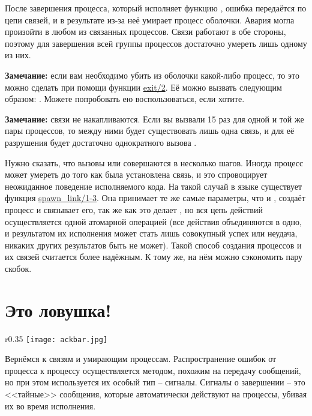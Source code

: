 После завершения процесса, который исполняет функцию , ошибка передаётся по цепи связей, и в результате из\--за неё умирает процесс оболочки.
Авария могла произойти в любом из связанных процессов.
Связи работают в обе стороны, поэтому для завершения всей группы процессов достаточно умереть лишь одному из них.\\
\colorbox{lgray}
{
\begin{minipage}{1.0\linewidth}
    \textbf{Замечание:} если вам необходимо убить из оболочки какой\--либо процесс, то это можно сделать при помощи функции \href{http://erldocs.com/R15B/erts/erlang.html\#exit/2}{exit/2}.
    Её можно вызвать следующим образом: .
    Можете попробовать ею воспользоваться, если хотите.
\end{minipage}
}
\colorbox{lgray}
{
\begin{minipage}{1.0\linewidth}
    \textbf{Замечание:} связи не накапливаются.
    Если вы вызвали  15 раз для одной и той же пары процессов, то между ними будет существовать лишь одна связь, и для её разрушения будет достаточно однократного вызова .
\end{minipage}
}

Нужно сказать, что вызовы  или  совершаются в несколько шагов.
Иногда процесс может умереть до того как была установлена связь, и это спровоцирует неожиданное поведение исполняемого кода.
На такой случай в языке существует функция \href{http://erldocs.com/R15B/erts/erlang.html\#spawn_link/1}{spawn\_link/1-3}.
Она принимает те же самые параметры, что и , создаёт процесс и связывает его, так же как это делает , но вся цепь действий осуществляется одной атомарной операцией (все действия объединяются в одно, и результатом их исполнения может стать лишь совокупный успех или неудача, никаких других результатов быть не может).
Такой способ создания процессов и их связей считается более надёжным.
К тому же, на нём можно сэкономить пару скобок.
\section{Это ловушка!}
\label{its-a-trap}
\begin{wrapfigure}{r}{0.35\linewidth}
    \texttt{[image: ackbar.jpg]}
\end{wrapfigure}
Вернёмся к связям и умирающим процессам.
Распространение ошибок от процесса к процессу осуществляется методом, похожим на передачу сообщений, но при этом используется их особый тип \--- сигналы.
Сигналы о завершении \--- это <<тайные>> сообщения, которые автоматически действуют на процессы, убивая их во время исполнения.

